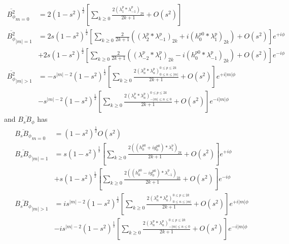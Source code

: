 \documentclass[a4paper, 11pt]{article}
\begin{document}
\begin{equation}
    \begin{aligned}
        \overline{B_\phi^2}_{m=0} &= 2\left(1 - s^2\right)^{\frac{1}{2}} \left[\sum_{k\geq 0} \frac{2 (\lambda_1^p * \lambda_{-1}^p)_{2k}}{2k+1} + O\left(s^2\right)\right] \\ 
        \overline{B_\phi^2}_{|m|=1} &= 2 s \left(1 - s^2\right)^{\frac{1}{2}} \left[\sum_{k\geq 0} \frac{2}{2k+1} \left((\lambda_2^p * \lambda_{-1}^p)_{2k} + i (h_0^{p0} * \lambda_{1}^p)_{2k}\right) + O\left(s^2\right)\right] e^{+i\phi} \\ 
        &+ 2 s \left(1 - s^2\right)^{\frac{1}{2}} \left[\sum_{k\geq 0} \frac{2}{2k+1} \left((\lambda_{-2}^p * \lambda_{1}^p)_{2k} - i(h_0^{p0} * \lambda_{-1}^p)_{2k}\right) + O\left(s^2\right)\right] e^{-i\phi} \\
        \overline{B_\phi^2}_{|m|>1} &= -s^{|m|-2} \left(1 - s^2\right)^{\frac{1}{2}} \left[\sum_{k\geq 0} \frac{2(\lambda_n^p * \lambda_{n}^p)_{0\leq n \leq |m|}^{0\leq p \leq 2k}}{2k+1} + O\left(s^2\right)\right] e^{+i|m|\phi} \\ 
        &- s^{|m|-2} \left(1 - s^2\right)^{\frac{1}{2}} \left[\sum_{k\geq 0} \frac{2(\lambda_n^p * \lambda_{n}^p)_{-|m|\leq n \leq 0}^{0\leq p \leq 2k}}{2k+1} + O\left(s^2\right)\right] e^{-i|m|\phi}
    \end{aligned}
\end{equation}
and $\overline{B_s B_\phi}$ has
\begin{equation}
\begin{aligned}
    \overline{B_s B_\phi}_{m=0} &= \left(1 - s^2\right)^{\frac{1}{2}} O\left(s^2\right) \\ 
    \overline{B_s B_\phi}_{|m|=1} &= s \left(1 - s^2\right)^{\frac{1}{2}} \left[\sum_{k\geq 0} \frac{2((h_0^{p0} + ig_0^{p0}) * \lambda_{1}^p)_{2k}}{2k+1} + O\left(s^2\right)\right] e^{+i\phi} \\ 
    &+ s \left(1 - s^2\right)^{\frac{1}{2}} \left[\sum_{k\geq 0} \frac{2((h_0^{p0} - ig_0^{p0}) * \lambda_{-1}^p)_{2k}}{2k+1} + O\left(s^2\right)\right] e^{-i\phi} \\
    \overline{B_s B_\phi}_{|m|>1} &= i s^{|m|-2} \left(1 - s^2\right)^{\frac{1}{2}} \left[\sum_{k\geq 0} \frac{2(\lambda_n^p * \lambda_{n}^p)_{0\leq n \leq |m|}^{0\leq p \leq 2k}}{2k+1} + O\left(s^2\right)\right] e^{+i|m|\phi} \\ 
    &- is^{|m|-2} \left(1 - s^2\right)^{\frac{1}{2}} \left[\sum_{k\geq 0} \frac{2(\lambda_n^p * \lambda_{n}^p)_{-|m|\leq n \leq 0}^{0\leq p \leq 2k}}{2k+1} + O\left(s^2\right)\right] e^{-i|m|\phi}
\end{aligned}
\end{equation}
\end{document}

